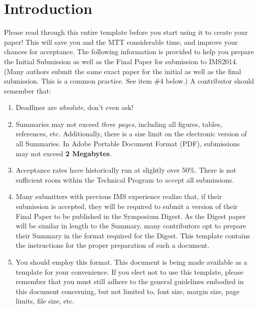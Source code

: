 \documentclass[conference]{IEEEtran}
\begin{document}
%
\IEEEpeerreviewmaketitle



\section{Introduction}
Please read through this entire template before you start using it to create your paper! This will save you and the MTT considerable time, and improve your chances for acceptance. The following information is provided to help you prepare the Initial Submission as well as the Final Paper for submission to IMS2014. (Many authors submit the same exact paper for the initial as well as the final submission. This is a common practice. See item \#4 below.) A contributor should remember that:
\begin{enumerate} 
 \setlength{\itemsep}{-2ex}  
 \setlength{\parskip}{0ex} 
 \setlength{\parsep}{0ex}
\item Deadlines are {\itshape absolute}, don't even ask!\hfil\break
\item Summaries may not exceed {\itshape three pages}, including all figures, tables, references, etc. Additionally, there is a size limit on the electronic version of all Summaries. In Adobe Portable Document Format (PDF), submissions may not exceed {\bfseries 2 Megabytes}.\hfil\break
\item Acceptance rates have historically run at slightly over 50\%. There is not sufficient room within the Technical Program to accept all submissions.\hfil\break
\item Many submitters with previous IMS experience realize that, if their submission is accepted, they will be required to submit a version of their Final Paper to be published in the Symposium Digest. As the Digest paper will be similar in length to the Summary, many contributors opt to prepare their Summary in the format required for the Digest. This template contains the instructions for the proper preparation of such a document.\hfil\break
\item You should employ this format. This document is being made available as a template for your convenience. If you elect not to use this template, please remember that you must still adhere to the general guidelines embodied in this document concerning, but not limited to, font size, margin size, page limits, file size, etc.  
\end{enumerate}
\end{document}
